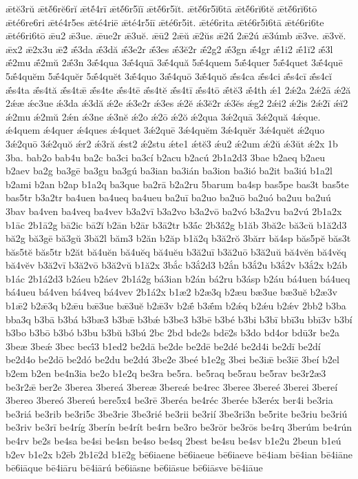 {ǣtĕ3rŭ
ǣtĕ́6rĕ6rĭ
ǣtĕ́4rī
ǣtĕ́6r5ĭī
ǣtĕ́6r5ĭt.
ǣtĕ́6r5ĭ6tā
ǣtĕ́6rĭ6tĕ
ǣtĕ́6rĭ6tō
ǣté6re6ri
ǣté4r5es
ǣté4riē
ǣté4r5iī
ǣté6r5it.
ǣté6rita
ǣté6r5i6tā
ǣté6ri6te
ǣté6ri6tō
ǣu2
ǣ3ue.
ǣue2r
ǣ3uĕ.
ǣū2
2ǣŭ
ǣ2ŭs
ǣ2ŭ́
2ǣ2ú
ǣ3úmb
ǣ3ve.
ǣ3vĕ.
ǣx2
ǣ2x3u
ǣ2́
ǣ́3da
ǣ́3dă
ǣ́3e2r
ǣ́3es
ǣ́3ĕ2r
ǣ́2g2
ǣ́3gn
ǣ́4gr
ǣ́1i2
ǣ́1ĭ2
ǣ́3l
ǣ́2mu
ǣ́2mŭ
2ǣ́3n
3ǣ́4qua
3ǣ́4quā
3ǣ́4quă
5ǣ́4quem
5ǣ́4quer
5ǣ́4quet
3ǣ́4quē
5ǣ́4quĕm
5ǣ́4quĕr
5ǣ́4quĕt
3ǣ́4quo
3ǣ́4quō
3ǣ́4quŏ
ǣ́s4ca
ǣ́s4ci
ǣ́s4cī
ǣ́s4cĭ
ǣ́s4ta
ǣ́s4tă
ǣ́s4tǣ
ǣ́s4te
ǣ́s4tē
ǣ́s4tĕ
ǣ́s4tī
ǣ́s4tō
ǣ́tĕ3
ǣ́4th
ǽ1
2ǽ2a
2ǽ2ā
ǽ2ă
2ǽæ
ǽc3ue
ǽ3da
ǽ3dă
ǽ2e
ǽ3e2r
ǽ3es
ǽ2ĕ
ǽ3ĕ2r
ǽ3ĕs
ǽg2
2ǽi2
ǽ2is
2ǽ2ī
ǽĭ2
ǽ2mu
ǽ2mŭ
2ǽn
ǽ3ne
ǽ3nĕ
ǽ2o
ǽ2ō
ǽ2ŏ
ǽ2qua
3ǽ2quā
3ǽ2quă
4ǽque.
ǽ4quem
ǽ4quer
ǽ4ques
ǽ4quet
3ǽ2quē
3ǽ4quĕm
3ǽ4quĕr
3ǽ4quĕt
ǽ2quo
3ǽ2quō
3ǽ2quŏ
ǽr2
ǽ3ră
ǽst2
ǽ2stu
ǽte1
ǽtĕ3
ǽu2
ǽ2um
ǽ2ŭ
ǽ3ŭt
ǽ2x
1b
3ba.
bab2o
bab4u
ba2c
ba3ci
ba3cí
b2acu
b2acú
2b1a2d3
3bae
b2aeq
b2aeu
b2aev
ba2g
ba3gē
ba3gu
ba3gú
ba3ian
ba3ián
ba3ion
ba3ió
ba2it
ba3iú
b1a2l
b2ami
b2an
b2ap
b1a2q
ba3que
ba2rā
b2a2ru
5barum
ba4sp
bas5pe
bas3t
bas5te
bas5tr
b3a2tr
ba4uen
ba4ueq
ba4ueu
ba2uī
ba2uo
ba2uō
ba2uó
ba2uu
ba2uú
3bav
ba4ven
ba4veq
ba4vev
b3a2vī
b3a2vo
b3a2vō
ba2vó
b3a2vu
ba2vú
2b1a2x
b1āc
2b1ā2g
bā2ic
bā2ĭ
b2ān
b2ār
b3ā2tr
b3ā́c
2b3ā́2g
b1ăb
3bă2c
bă3cŭ
b1ă2d3
bă2g
bă3gē
bă3gŭ
3bă2l
băm3
b2ăn
b2ăp
b1ă2q
b3ă2rŏ
3bărr
bă4sp
băs5pĕ
băs3t
băs5tĕ
băs5tr
b2ăt
bă4uĕn
bă4uĕq
bă4uĕu
b3ă2uī
b3ă2uō
b3ă2uŭ
bă4vĕn
bă4vĕq
bă4vĕv
b3ă2vī
b3ă2vō
b3ă2vŭ
b1ă2x
3bắc
b3ắ2d3
b2ắn
b3ắ2u
b3ắ2v
b3ắ2x
b2áb
b1ác
2b1á2d3
b2áeu
b2áev
2b1á2g
bá3ian
b2án
bá2ru
b3ásp
b2áu
bá4uen
bá4ueq
bá4ueu
bá4ven
bá4veq
bá4vev
2b1á2x
b1æ2
b2æ3q
b2æu
bæ3ue
bæ3uĕ
b2æ3v
b1ǣ2
b2ǣ3q
b2ǣu
bǣ3ue
bǣ3uĕ
b2ǣ3v
b2ǣ́
b3ǣ́m
b2ǽq
b2ǽu
b2ǽv
2bb2
b3ba
bba3q
b3bā
b3bá
b3bæ3
b3bǣ
b3bǽ
b3be3
b3bē
b3bé
b3bi
b3bī
bbī3u
bbī3v
b3bí
b3bo
b3bō
b3bó
b3bu
b3bŭ
b3bú
2bc
2bd
bde2s
bdē2s
b3do
bd4or
bdū3r
be2a
3beæ
3beǽ
3bec
becī́3
b1ed2
be2dā
be2de
be2dē
be2dé
be2d4i
be2dī
be2dí
be2d4o
be2dō
be2dó
be2du
be2dú
3be2e
3beé
b1e2g
3bei
be3iǣ
be3iē
3beí
b2el
b2em
b2en
be4n3ia
be2o
b1e2q
be3ra
be5ra.
be5raq
be5rau
be5rav
be3r2æ3
be3r2ǣ
ber2e
3berea
3bereá
3bereæ
3bereǽ
be4rec
3beree
3bereé
3berei
3bereí
3bereo
3bereó
3bereú
bere5x4
be3rē
3beréa
be4réc
3berée
b3eréx
ber4i
be3ria
be3riá
be3rib
be3ri5c
3be3rie
3be3rié
be3rii
be3rií
3be3ri3n
be5rite
be3riu
be3riú
be3riv
be3rī
be4ríg
3berín
be4rít
be4rn
be3ro
be3rōr
be3rōs
be4rq
3berúm
be4rún
be4rv
be2s
be4sa
be4si
be4sn
be4so
be4sq
2best
be4su
be4sv
b1e2u
2beun
b1eú
b2ev
b1e2x
b2ēb
2b1ē2d
b1ē2g
bē6iaene
bē6iaeue
bē6iaeve
bē4iam
bē4ian
bē4iāne
bē6iāque
bē4iāru
bē4iārú
bē6iāsne
bē6iāsue
bē6iāsve
bē4iāue
}
